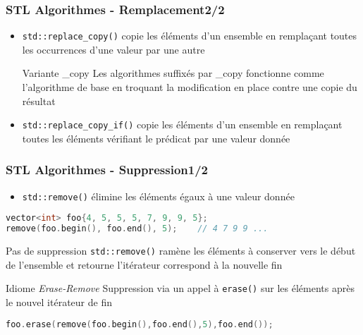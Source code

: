 \documentclass[C++.tex]{subfiles}
\begin{document}
\begin{frame}[fragile]
	\frametitle{STL Algorithmes - Remplacement\titlehfill{}2/2}
	\begin{itemize}
		\item \lstinline|std::replace_copy()| copie les éléments d'un ensemble en remplaçant toutes les occurrences d'une valeur par une autre
		\begin{block}{Variante \og \_copy\fg{}}
			Les algorithmes suffixés par \_copy fonctionne comme l'algorithme de base en troquant la modification en place contre une copie du résultat
		\end{block}
		\item \lstinline|std::replace_copy_if()| copie les éléments d'un ensemble en remplaçant toutes les éléments vérifiant le prédicat par une valeur donnée
	\end{itemize}
\end{frame}

\begin{frame}[fragile]
	\frametitle{STL Algorithmes - Suppression\titlehfill{}1/2}
	\begin{itemize}
		\item \lstinline|std::remove()| \og élimine\fg{} les éléments égaux à une valeur donnée
	\end{itemize}

	\begin{lstlisting}[language=C++]
vector<int> foo{4, 5, 5, 5, 7, 9, 9, 5};
remove(foo.begin(), foo.end(), 5);    // 4 7 9 9 ...\end{lstlisting}


	\pause

	\begin{alertblock}{Pas de suppression}
		\lstinline|std::remove()| ramène les éléments à conserver vers le début de l'ensemble et retourne l'itérateur correspond à la nouvelle fin
	\end{alertblock}


	\pause

	\begin{block}{Idiome \textit{Erase-Remove}}
		Suppression via un appel à \lstinline|erase()| sur les éléments après le nouvel itérateur de fin
	
		\begin{lstlisting}[language=C++]
foo.erase(remove(foo.begin(),foo.end(),5),foo.end());\end{lstlisting}
	\end{block}
\end{frame}
\end{document}
